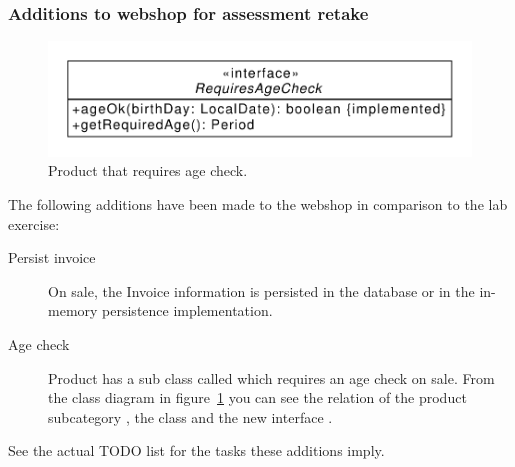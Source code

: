 \subsubsection{Additions to webshop for assessment retake}
\begin{figure}
\includegraphics[width=.4\textwidth]{figures/booze.pdf}
\caption{\label{fig:booze}Product that requires age check.}
\end{figure}
The following additions have been made to the webshop in comparison to
the lab exercise:
\begin{description}
\item[Persist invoice] On sale, the Invoice information is persisted in the database or
  in the in-memory persistence  implementation. 
\item[Age check] Product has a sub class called  which
  requires an age check on sale. From the class diagram in
  figure~\ref{fig:booze} you can see the relation of the product
  subcategory , the  class and the new
  interface .
\end{description}
See the actual TODO list for the tasks these additions imply.


